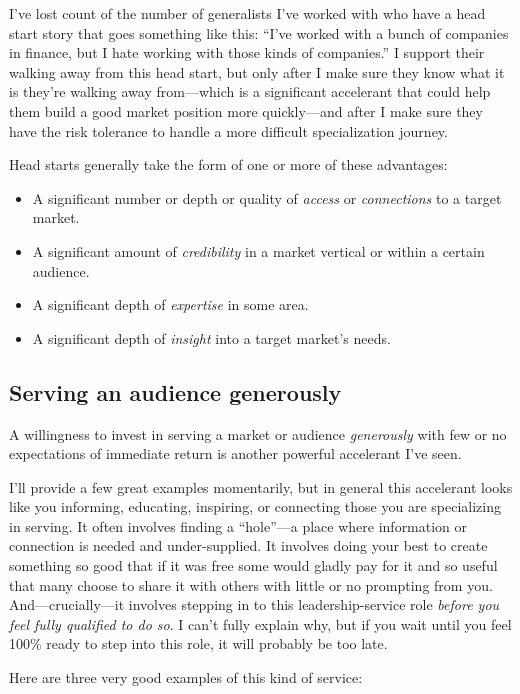 I’ve lost count of the number of generalists I’ve worked with who have a head start story that goes something like this: “I’ve worked with a bunch of companies in finance, but I hate working with those kinds of companies.” I support their walking away from this head start, but only after I make sure they know what it is they’re walking away from—which is a significant accelerant that could help them build a good market position more quickly—and after I make sure they have the risk tolerance to handle a more difficult specialization journey.

Head starts generally take the form of one or more of these advantages:

\begin{itemize}
\item A significant number or depth or quality of \emph{access} or \emph{connections} to a target market.
\item A significant amount of \emph{credibility} in a market vertical or within a certain audience.
\item A significant depth of \emph{expertise} in some area.
\item A significant depth of \emph{insight} into a target market’s needs.
\end{itemize}

\subsection{Serving an audience generously}

A willingness to invest in serving a market or audience \emph{generously} with few or no expectations of immediate return is another powerful accelerant I’ve seen.

I’ll provide a few great examples momentarily, but in general this accelerant looks like you informing, educating, inspiring, or connecting those you are specializing in serving. It often involves finding a “hole”—a place where information or connection is needed and under-supplied. It involves doing your best to create something so good that if it was free some would gladly pay for it and so useful that many choose to share it with others with little or no prompting from you. And—crucially—it involves stepping in to this leadership-service role \emph{before you feel fully qualified to do so}. I can’t fully explain why, but if you wait until you feel 100\% ready to step into this role, it will probably be too late.

Here are three very good examples of this kind of service:

